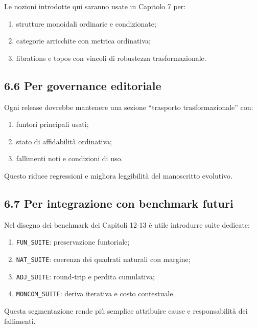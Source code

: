 Le nozioni introdotte qui saranno usate in Capitolo 7 per:

\begin{enumerate}
\def\labelenumi{\arabic{enumi}.}
\tightlist
\item
  strutture monoidali ordinarie e condizionate;
\item
  categorie arricchite con metrica ordinativa;
\item
  fibrations e topos con vincoli di robustezza trasformazionale.
\end{enumerate}

\subsection{6.6 Per governance editoriale}

Ogni release dovrebbe mantenere una sezione ``trasporto trasformazionale'' con:

\begin{enumerate}
\def\labelenumi{\arabic{enumi}.}
\tightlist
\item
  funtori principali usati;
\item
  stato di affidabilità ordinativa;
\item
  fallimenti noti e condizioni di uso.
\end{enumerate}

Questo riduce regressioni e migliora leggibilità del manoscritto evolutivo.

\subsection{6.7 Per integrazione con benchmark futuri}

Nel disegno dei benchmark dei Capitoli 12-13 è utile introdurre suite dedicate:

\begin{enumerate}
\def\labelenumi{\arabic{enumi}.}
\tightlist
\item
  \texttt{FUN\_SUITE}: preservazione funtoriale;
\item
  \texttt{NAT\_SUITE}: coerenza dei quadrati naturali con margine;
\item
  \texttt{ADJ\_SUITE}: round-trip e perdita cumulativa;
\item
  \texttt{MONCOM\_SUITE}: deriva iterativa e costo contestuale.
\end{enumerate}

Questa segmentazione rende più semplice attribuire cause e responsabilità dei fallimenti.

